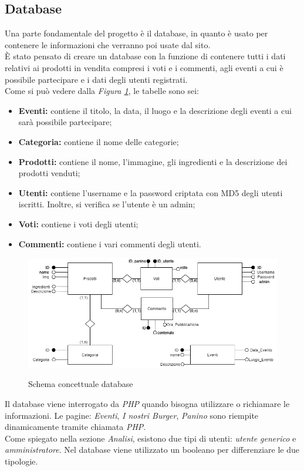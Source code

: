 \subsection{Database}
\label{database}
Una parte fondamentale del progetto è il database, in quanto è usato per contenere le informazioni che verranno poi usate dal sito.\\
È stato pensato di creare un database con la funzione di contenere tutti i dati relativi ai prodotti in vendita compresi i voti e i commenti, agli eventi a cui è possibile partecipare e i dati degli utenti registrati.\\
Come si può vedere dalla \emph{Figura \ref{Fig:schemadb}}, le tabelle sono sei:
\begin{itemize}
		\item \textbf{Eventi:} contiene il titolo, la data, il luogo e la descrizione degli eventi a cui sarà possibile partecipare;
		\item \textbf{Categoria:} contiene il nome delle categorie;
		\item \textbf{Prodotti:} contiene il nome, l'immagine, gli ingredienti e la descrizione dei prodotti venduti;
		\item \textbf{Utenti:} contiene l'username e la password criptata con MD5 degli utenti iscritti. Inoltre, si verifica se l'utente è un admin;
        \item \textbf{Voti:} contiene i voti degli utenti;
        \item \textbf{Commenti:} contiene i vari commenti degli utenti.
\end{itemize}
\begin{figure}[!h]
	\centering	%
	\includegraphics[width=0.7\linewidth]{../database/DiagrammaER.png}\\
    \caption{Schema concettuale database}
	\label{Fig:schemadb}
\end{figure}
Il database viene interrogato da \emph{PHP} quando bisogna utilizzare o richiamare le informazioni.
Le pagine: \emph{Eventi}, \emph{I nostri Burger}, \emph{Panino} sono riempite dinamicamente tramite chiamata \emph{PHP}.\\
Come spiegato nella sezione \emph{Analisi}, esistono due tipi di utenti: \emph{utente generico} e \emph{amministratore}. Nel database viene utilizzato un booleano per differenziare le due tipologie.\\ 